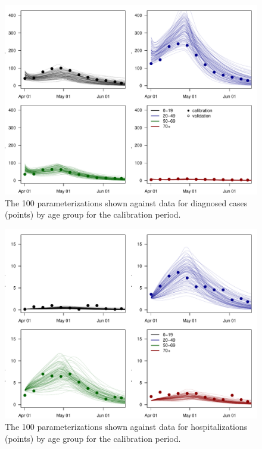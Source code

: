 \documentclass[11pt]{article}
\begin{document}
\begin{figure}[tbp]
\centering
\includegraphics[width=\textwidth]{params_calib_cases}
\caption{The 100 parameterizations shown against data for diagnosed cases (points) by age group for the calibration period.}
\label{fig:calib_cases}
\end{figure}

\begin{figure}[tbp]
\centering
\includegraphics[width=\textwidth]{params_calib_hosp}
\caption{The 100 parameterizations shown against data for hospitalizations (points) by age group for the calibration period.}
\label{fig:calib_hosp}
\end{figure}
\end{document}
